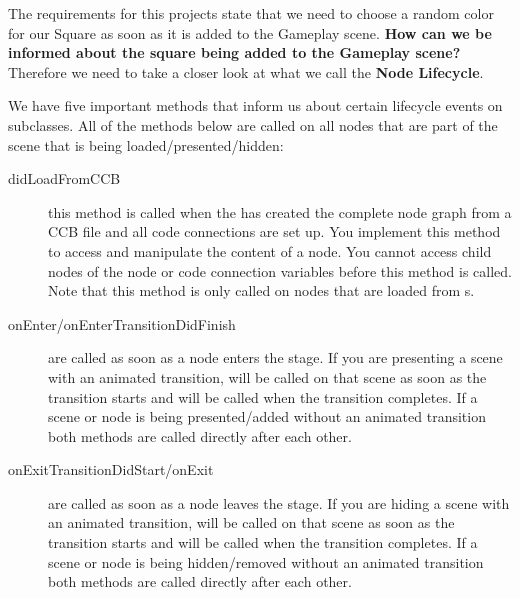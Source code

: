 The requirements for this projects state that we need to choose a random color
for our Square as soon as it is added to the Gameplay scene. \textbf{How can we
be informed about the square being added to the Gameplay scene?} Therefore we
need to take a closer look at what we call the \textbf{Node
Lifecycle}.

We have five important methods that inform us about certain lifecycle events on
\ccnode{} subclasses. All of the methods below are called on all nodes that are
part of the scene that is being loaded/presented/hidden:

\begin{description}
  \item[didLoadFromCCB] this method is called when the 
  has created the complete node graph from a CCB file and all code connections
  are set up. You implement this method to access and manipulate the content of
  a node. You cannot access child nodes of the node or code connection
  variables before this method is called. Note that this method is only called
  on nodes that are loaded from \ccbfile{}s.
  \item[onEnter/onEnterTransitionDidFinish] are called as soon as a node enters
  the stage. If you are presenting a scene with an animated transition,
   will be called on that scene as soon as the transition
  starts and  will be called when the transition
  completes. If a scene or node is being presented/added without an animated
  transition both methods are called directly after each other.
  \item[onExitTransitionDidStart/onExit] are called as soon as a node leaves the
  stage. If you are hiding a scene with an animated transition,
   will be called on that scene as soon as
  the transition starts and  will be called when the
  transition completes. If a scene or node is being hidden/removed without an
  animated transition both methods are called directly after each other.
\end{description}

